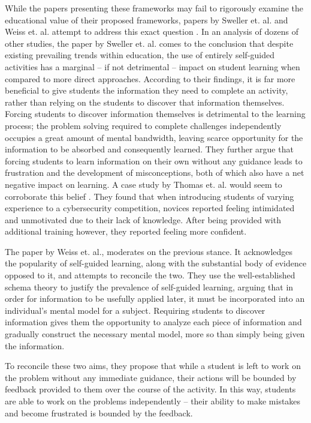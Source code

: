 \documentclass{article}
\begin{document}
    While the papers presenting these frameworks may fail to rigorously examine the educational value of their proposed frameworks, papers by Sweller et. al. and Weiss et. al. attempt to address this exact question \cite{J-Sweller,R-Weiss}. 
    In an analysis of dozens of other studies, the paper by Sweller et. al. comes to the conclusion that despite existing prevailing trends within education, the use of entirely self-guided activities has a marginal -- if not detrimental -- impact on student learning when compared to more direct approaches. 
    According to their findings, it is far more beneficial to give students the information they need to complete an activity, rather than relying on the students to discover that information themselves. 
    Forcing students to discover information themselves is detrimental to the learning process; 
    the problem solving required to complete challenges independently occupies a great amount of mental bandwidth, leaving scarce opportunity for the information to be absorbed and consequently learned. 
    They further argue that forcing students to learn information on their own without any guidance leads to frustration and the development of misconceptions, both of which also have a net negative impact on learning. 
    A case study by Thomas et. al. would seem to corroborate this belief \cite{L-Thomas}. 
    They found that when introducing students of varying experience to a cybersecurity competition, novices reported feeling intimidated and unmotivated due to their lack of knowledge. 
    After being provided with additional training however, they reported feeling more confident. 

    The paper by Weiss et. al., moderates on the previous stance. 
    It acknowledges the popularity of self-guided learning, along with the substantial body of evidence opposed to it, and attempts to reconcile the two. 
    They use the well-established schema theory to justify the prevalence of self-guided learning, arguing that in order for information to be usefully applied later, it must be incorporated into an individual’s mental model for a subject. 
    Requiring students to discover information gives them the opportunity to analyze each piece of information and gradually construct the necessary mental model, more so than simply being given the information. 

    To reconcile these two aims, they propose that while a student is left to work on the problem without any immediate guidance, their actions will be bounded by feedback provided to them over the course of the activity. 
    In this way, students are able to work on the problems independently -- their ability to make mistakes and become frustrated is bounded by the feedback. 
\end{document}
